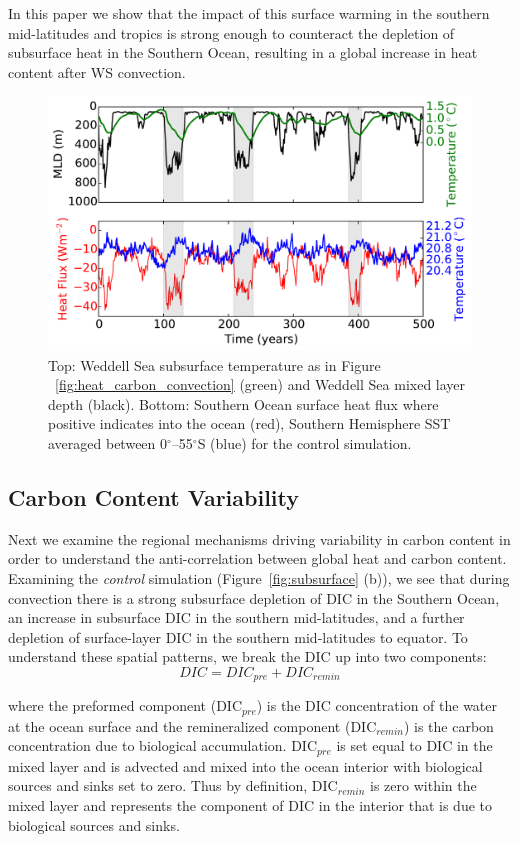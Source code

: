In this paper we show that the impact of this surface warming in the southern
mid-latitudes and tropics is strong enough to counteract the depletion of
subsurface heat in the Southern Ocean, resulting in a global increase in heat
content after WS convection.

\begin{figure}
\noindent
\centering
\includegraphics[width=33pc]{figure9.pdf}
\caption{Top: Weddell Sea subsurface temperature as in Figure
~\ref{fig:heat_carbon_convection} (green) and Weddell Sea mixed layer depth
(black). Bottom: Southern Ocean surface heat flux where positive indicates into
the ocean (red), Southern Hemisphere SST averaged between
0$^{\circ}$--55$^{\circ}$S (blue) for the control simulation.}
\label{fig:heat_flux_fig}
\end{figure}

\subsection{Carbon Content Variability}
Next we examine the regional mechanisms driving variability in carbon content in
order to understand the anti-correlation between global heat and carbon content.
Examining the \textit{control} simulation (Figure~\ref{fig:subsurface} (b)), we
see that during convection there is a strong subsurface depletion of DIC in the
Southern Ocean, an increase in subsurface DIC in the southern mid-latitudes, and
a further depletion of surface-layer DIC in the southern mid-latitudes to equator.
To understand these spatial patterns, we
break the DIC up into two components:
\begin{equation}
DIC = DIC_{pre} + DIC_{remin}
\end{equation}

where the preformed component (DIC$_{pre}$) is the DIC concentration of the
water at the ocean surface and the remineralized component (DIC$_{remin}$) is
the carbon concentration due to biological accumulation. DIC$_{pre}$ is set
equal to DIC in the mixed layer and is advected and mixed into the ocean
interior with biological sources and sinks set to zero. Thus by definition,
 DIC$_{remin}$ is zero within the mixed layer and represents the component of
 DIC in the interior that is due to biological sources and sinks.

